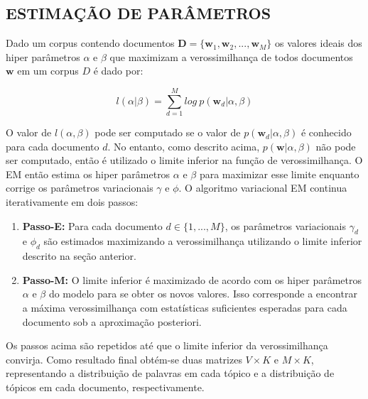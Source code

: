 \documentclass[12pt,a4paper]{article}
\begin{document}
  \subsection{ESTIMAÇÃO DE PARÂMETROS}
  Dado um corpus contendo documentos $\textbf{D} = \{\textbf{w}_1, \textbf{w}_2, . . ., \textbf{w}_M\}$ os valores ideais dos hiper parâmetros $\alpha$ e $\beta$
   que maximizam a verossimilhança de todos documentos $\textbf{w}$ em um corpus $D$ é dado por:
  
  \begin{equation}
  l(\alpha|\beta) = \sum_{d=1}^{M} log\ p(\textbf{w}_d|\alpha,\beta)
  \end{equation}
  
  O valor de $l(\alpha, \beta)$ pode ser computado se o valor de $p(\textbf{w}_d|\alpha, \beta)$ é conhecido para cada documento $d$. No entanto,
   como descrito acima, $p(\textbf{w}|\alpha,\beta)$ não pode ser computado, então é utilizado o limite inferior na função de verossimilhança.
   O EM então estima os hiper parâmetros $\alpha$ e $\beta$ para maximizar esse limite enquanto corrige os parâmetros variacionais $\gamma$ e $\phi$. 
   O algoritmo variacional EM continua iterativamente em dois passos:
  
  \begin{enumerate}
  \item \textbf{Passo-E:} Para cada documento $d \in \{1,. . . , M\}$, os parâmetros variacionais $\gamma_d$ e $\phi_d$ são estimados maximizando a verossimilhança utilizando o limite inferior descrito na seção anterior.
  \item \textbf{Passo-M:} O limite inferior é maximizado  de acordo com os hiper parâmetros $\alpha$ e $\beta$ do modelo para se obter os novos valores. 
   Isso corresponde a encontrar a máxima verossimilhança com estatísticas suficientes esperadas para cada documento sob a aproximação posteriori.
  \end{enumerate}
  
  Os passos acima são repetidos até que o limite inferior da verossimilhança convirja. Como resultado final obtém-se duas matrizes $V \times K$ e $M \times K$,
   representando  a distribuição de palavras em cada tópico e a distribuição de tópicos em cada documento, respectivamente.
  
  
  
\end{document}
